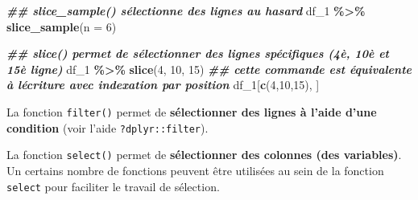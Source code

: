 \documentclass[
]{book}
\newenvironment{Shaded}{\begin{snugshade}}{\end{snugshade}}
\newcommand{\AttributeTok}[1]{\textcolor[rgb]{0.13,0.29,0.53}{#1}}
\newcommand{\CommentTok}[1]{\textcolor[rgb]{0.56,0.35,0.01}{\textit{#1}}}
\newcommand{\DecValTok}[1]{\textcolor[rgb]{0.00,0.00,0.81}{#1}}
\newcommand{\DocumentationTok}[1]{\textcolor[rgb]{0.56,0.35,0.01}{\textbf{\textit{#1}}}}
\newcommand{\FunctionTok}[1]{\textcolor[rgb]{0.13,0.29,0.53}{\textbf{#1}}}
\newcommand{\NormalTok}[1]{#1}
\newcommand{\SpecialCharTok}[1]{\textcolor[rgb]{0.81,0.36,0.00}{\textbf{#1}}}
\begin{document}
\begin{Shaded}
\begin{Highlighting}[]
\DocumentationTok{\#\# slice\_sample() sélectionne des lignes au hasard}
\NormalTok{df\_1 }\SpecialCharTok{\%\textgreater{}\%} \FunctionTok{slice\_sample}\NormalTok{(}\AttributeTok{n =} \DecValTok{6}\NormalTok{)}

\DocumentationTok{\#\# slice() permet de sélectionner des lignes spécifiques (4è, 10è et 15è ligne)}
\NormalTok{df\_1 }\SpecialCharTok{\%\textgreater{}\%} \FunctionTok{slice}\NormalTok{(}\DecValTok{4}\NormalTok{, }\DecValTok{10}\NormalTok{, }\DecValTok{15}\NormalTok{) }
\DocumentationTok{\#\# cette commande est équivalente à l\textquotesingle{}écriture avec indexation par position }
\NormalTok{df\_1[}\FunctionTok{c}\NormalTok{(}\DecValTok{4}\NormalTok{,}\DecValTok{10}\NormalTok{,}\DecValTok{15}\NormalTok{), ]}
\end{Highlighting}
\end{Shaded}

La fonction \texttt{filter()} permet de \textbf{sélectionner des lignes à l'aide d'une condition} (voir l'aide \texttt{?dplyr::filter}).

\begin{Shaded}
\end{Shaded}

La fonction \texttt{select()} permet de \textbf{sélectionner des colonnes (des variables)}. Un certains nombre de fonctions peuvent être utilisées au sein de la fonction \texttt{select} pour faciliter le travail de sélection.
\end{document}
